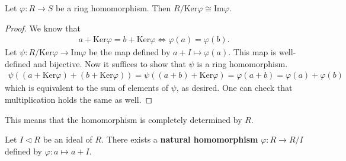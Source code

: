 \documentclass{memoir}
\begin{document}
\begin{thm}
	Let \(\varphi:R\to S\) be a ring homomorphism. Then \(R / \textrm{Ker}\varphi \cong \textrm{Im}\varphi\).
\end{thm}
\begin{proof}
We know that
\begin{align*}
	a + \textrm{Ker}\varphi = b + \textrm{Ker}\varphi \iff \varphi(a) = \varphi(b).
\end{align*}
Let \(\psi:R / \textrm{Ker}\varphi \to \textrm{Im}\varphi\) be the map defined by \(a+I \mapsto \varphi(a)\). This map is well-defined and bijective. Now it suffices to show that \(\psi\) is a ring homomorphism.
\begin{align*}
	\psi\left( (a+ \textrm{Ker}\varphi) + (b + \textrm{Ker}\varphi) \right) = \psi\left( (a+b)+ \textrm{Ker}\varphi \right) = \varphi(a+b) = \varphi(a) + \varphi(b) 
\end{align*}
which is equivalent to the sum of elements of \(\psi\), as desired. One can check that multiplication holds the same as well.
\end{proof}
This means that the homomorphism is completely determined by \(R\).
\begin{defn}
	Let \(I \triangleleft R\) be an ideal of \(R\). There exists a \textbf{natural homomorphism}  \(\varphi:R\to R / I\) defined by \(\varphi:a\mapsto a+I\).
\end{defn}
\end{document}
